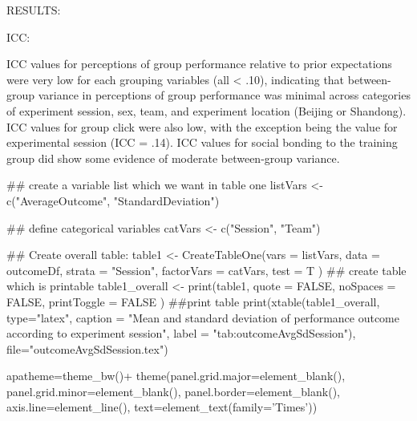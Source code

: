 RESULTS:

ICC:







ICC values for perceptions of group performance relative to prior expectations were very low for each grouping variables (all < .10), indicating that between-group variance in perceptions of group performance was minimal across categories of experiment session, sex, team, and experiment location (Beijing or Shandong).  ICC values for group click were also low, with the exception being the value for experimental session (ICC = .14).
ICC values for social bonding to the training group did show some evidence of moderate between-group variance.

  ## create a variable list which we want in table one
  listVars <- c("AverageOutcome", "StandardDeviation")

  ## define categorical variables
  catVars <- c("Session", "Team")


  ## Create overall table:
  table1 <- CreateTableOne(vars = listVars,
                         data = outcomeDf,
                         strata = "Session",
                         factorVars = catVars,
                         test = T
                         )
 ## create table which is printable
 table1_overall <- print(table1,
                             quote = FALSE,
                             noSpaces = FALSE,
                             printToggle = FALSE
                             )
 ##print table
  print(xtable(table1_overall, type="latex",
                         caption = "Mean and standard deviation of performance outcome according to experiment session",
                         label = "tab:outcomeAvgSdSession"),
                         file="outcomeAvgSdSession.tex")




apatheme=theme_bw()+
  theme(panel.grid.major=element_blank(),
        panel.grid.minor=element_blank(),
        panel.border=element_blank(),
        axis.line=element_line(),
        text=element_text(family='Times'))

